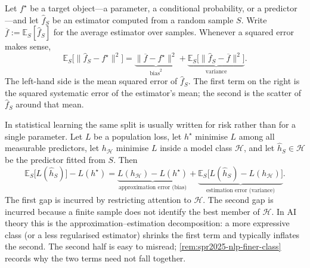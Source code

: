 \documentclass[11pt,a4paper]{article}
\theoremstyle{definition}
\begin{document}
\begin{definition}\label{def:spr2025-nlp-bias-variance}
Let \(f^\star\) be a target object---a parameter, a conditional probability, or a predictor---and let \(\widehat f_S\) be an estimator computed from a random sample \(S\). Write \(\overline f:=\mathbb{E}_S[\widehat f_S]\) for the average estimator over samples. Whenever a squared error makes sense,
\[
\mathbb{E}_S\bigl[\|\widehat f_S-f^\star\|^2\bigr]
=\underbrace{\|\overline f-f^\star\|^2}_{\mathrm{bias}^2}
+\underbrace{\mathbb{E}_S\bigl[\|\widehat f_S-\overline f\|^2\bigr]}_{\mathrm{variance}}.
\]
The left-hand side is the mean squared error of \(\widehat f_S\). The first term on the right is the squared systematic error of the estimator's mean; the second is the scatter of \(\widehat f_S\) around that mean.

In statistical learning the same split is usually written for risk rather than for a single parameter. Let \(L\) be a population loss, let \(h^\star\) minimise \(L\) among all measurable predictors, let \(h_{\mathcal{H}}\) minimise \(L\) inside a model class \(\mathcal{H}\), and let \(\widehat h_S\in\mathcal{H}\) be the predictor fitted from \(S\). Then
\[
\mathbb{E}_S\bigl[L(\widehat h_S)\bigr]-L(h^\star)
=\underbrace{L(h_{\mathcal{H}})-L(h^\star)}_{\text{approximation error (bias)}}
+\underbrace{\mathbb{E}_S\bigl[L(\widehat h_S)-L(h_{\mathcal{H}})\bigr]}_{\text{estimation error (variance)}}.
\]
The first gap is incurred by restricting attention to \(\mathcal{H}\). The second gap is incurred because a finite sample does not identify the best member of \(\mathcal{H}\). In AI theory this is the approximation--estimation decomposition: a more expressive class (or a less regularised estimator) shrinks the first term and typically inflates the second. The second half is easy to misread; \cref{rem:spr2025-nlp-finer-class} records why the two terms need not fall together.
\end{definition}
\end{document}
